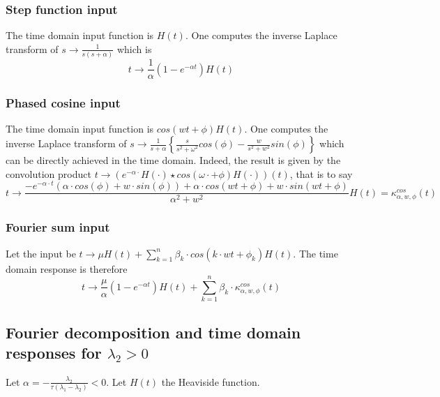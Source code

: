 \documentclass[preprint]{elsarticle}
\begin{document}
\subsubsection{Step function input}

The time domain input function is $H\left(t\right)$. One computes
the inverse Laplace transform of $s\rightarrow\frac{1}{s\left(s+\alpha\right)}$
which is 
\[
t\rightarrow\frac{1}{\alpha}\left(1-e^{-\alpha t}\right)H\left(t\right)
\]



\subsubsection{Phased cosine input}

The time domain input function is $cos\left(wt+\phi\right)H\left(t\right)$.
One computes the inverse Laplace transform of $s\rightarrow\frac{1}{s+\alpha}\left\{ \frac{s}{s^{2}+\omega^{2}}cos\left(\phi\right)-\frac{w}{s^{2}+w^{2}}sin\left(\phi\right)\right\} $
which can be directly achieved in the time domain. Indeed, the result
is given by the convolution product $t\rightarrow\left(e^{-\alpha\cdot}H\left(\cdot\right)\star cos\left(\omega\cdot+\phi\right)H\left(\cdot\right)\right)\left(t\right)$,
that is to say 
\[
t\rightarrow\frac{-e^{-\alpha\cdot t}\left(\alpha\cdot cos\left(\phi\right)+w\cdot sin\left(\phi\right)\right)+\alpha\cdot cos\left(wt+\phi\right)+w\cdot sin\left(wt+\phi\right)}{\alpha^{2}+w^{2}}H\left(t\right)=\kappa_{\alpha,w,\phi}^{cos}\left(t\right)
\]



\subsubsection{Fourier sum input}

Let the input be $t\rightarrow\mu H\left(t\right)+\sum_{k=1}^{n}\beta_{k}\cdot cos\left(k\cdot wt+\phi_{k}\right)H\left(t\right)$.
The time domain response is therefore 
\[
t\rightarrow\frac{\mu}{\alpha}\left(1-e^{-\alpha t}\right)H\left(t\right)+\sum_{k=1}^{n}\beta_{k}\cdot\kappa_{\alpha,w,\phi}^{cos}\left(t\right)
\]



\subsection{Fourier decomposition and time domain responses for $\lambda_{2}>0$}

Let $\alpha=-\frac{\lambda_{2}}{\tau\left(\lambda_{1}-\lambda_{2}\right)}<0$.
Let $H\left(t\right)$ the Heaviside function.
\end{document}

